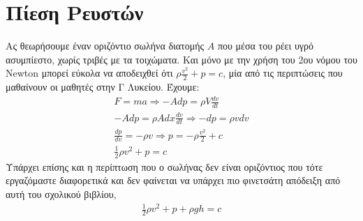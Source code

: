 \documentclass[12pt]{article}
\begin{document}
\section{Πίεση Ρευστών}
Ας θεωρήσουμε έναν οριζόντιο σωλήνα διατομής $A$ που μέσα του ρέει υγρό ασυμπίεστο, χωρίς τριβές με τα τοιχώματα. Και μόνο με την χρήση του 2ου νόμου του Newton μπορεί εύκολα να αποδειχθεί ότι $ρ\frac{v^2}{2}+p=c$, μία από τις περιπτώσεις που μαθαίνουν οι μαθητές στην Γ Λυκείου. Έχουμε:
\begin{gather*}
  F=ma \Rightarrow -Adp=ρV\frac{dv}{dt} \\
  -Adp=ρAdx\frac{dv}{dt} \Rightarrow -dp=ρv dv \\
  \frac{dp}{dv}=-ρv \Rightarrow p=-ρ\frac{v^2}{2}+c \\
  \frac{1}{2}ρv^2+p=c
\end{gather*}
Υπάρχει επίσης και η περίπτωση που ο σωλήνας δεν είναι οριζόντιος που τότε εργαζόμαστε διαφορετικά και δεν φαίνεται να υπάρχει πιο φινετσάτη απόδειξη από αυτή του σχολικού βιβλίου,
\begin{gather*}
  \frac{1}{2}ρv^2+p+ρgh=c
\end{gather*}
\end{document}
